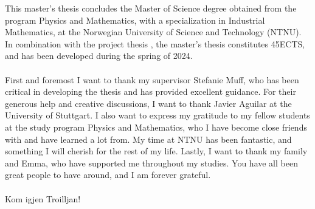 This master's thesis concludes the Master of Science degree obtained from the program Physics and Mathematics, with a specialization in Industrial Mathematics, at the Norwegian University of Science and Technology (NTNU). In combination with the project thesis \citep{Arnstad:Relative_variable_importance_in_Bayesian_linear_mixed_models:2024}, the master's thesis constitutes 45ECTS, and has been developed during the spring of 2024.
\\
\\
First and foremost I want to thank my supervisor Stefanie Muff, who has been critical in developing the thesis and has provided excellent guidance. For their generous help and creative discussions, I want to thank Javier Aguilar at the University of Stuttgart. I also want to express my gratitude to my fellow students at the study program Physics and Mathematics, who I have become close friends with and have learned a lot from. My time at NTNU has been fantastic, and something I will cherish for the rest of my life. Lastly, I want to thank my family and Emma, who have supported me throughout my studies. You have all been great people to have around, and I am forever grateful. 
\\
\\
Kom igjen Troilljan!